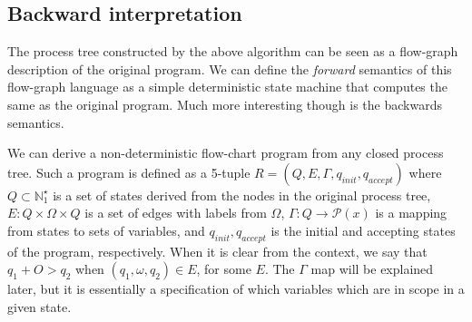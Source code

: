 \documentclass[10pt]{../sigplanconf}
\newcommand{\gen}{\ensuremath{~{\leq\kern-6pt \raisebox{1pt}{$\cdot$}}~}}
\begin{document}



\subsection{Backward interpretation}
The process tree constructed by the above algorithm can be seen as a
flow-graph description of the original program. We can define the
\textit{forward} semantics of this flow-graph language as a simple
deterministic state machine that computes the same as the original
program. Much more interesting though is the backwards semantics.

We can derive a non-deterministic flow-chart program from any closed
process tree. Such a program is defined as a 5-tuple $R = (Q, E,
\Gamma, q_{init}, q_{accept})$ where $Q \subset \mathbb{N}^\star_1$ is
a set of states derived from the nodes in the original process tree,
$E : Q \times \Omega \times Q$ is a set of edges with labels from
$\Omega$, $\Gamma : Q \rightarrow \mathcal{P}(x)$ is a mapping from
states to sets of variables, and $q_{init},q_{accept}$ is the initial
and accepting states of the program, respectively. When it is clear
from the context, we say that $q_1 +O> q_2$ when $(q_1, \omega, q_2)
\in E$, for some $E$. The $\Gamma$ map will be explained later, but it
is essentially a specification of which variables which are in scope
in a given state.
\end{document}
